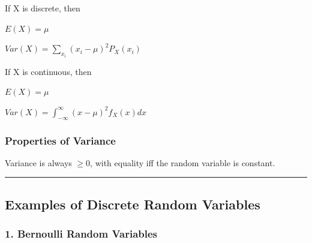 If X is discrete, then

\(E(X) = \mu\)

\(Var(X) = \displaystyle\sum_{x_i}(x_i-\mu)^2P_X(x_i)\)

If X is continuous, then

\(E(X) = \mu\)

\(Var(X) = \displaystyle\int_{-\infty}^{\infty}(x-\mu)^2f_X(x)dx\)

\hypertarget{properties-of-variance}{%
\subsubsection{Properties of Variance}\label{properties-of-variance}}

Variance is always \(\geq0\), with equality iff the random variable is
constant.

\begin{center}\rule{0.5\linewidth}{0.5pt}\end{center}

\hypertarget{examples-of-discrete-random-variables}{%
\subsection{Examples of Discrete Random
Variables}\label{examples-of-discrete-random-variables}}

\hypertarget{bernoulli-random-variables}{%
\subsubsection{1. Bernoulli Random
Variables}\label{bernoulli-random-variables}}

